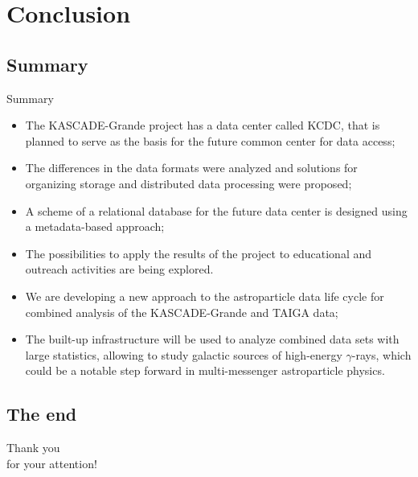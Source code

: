 \section{Conclusion}
\subsection{Summary}

\begin{frame}{Summary}
  \begin{itemize}
    \item The KASCADE-Grande project has a data center called KCDC, that is planned to serve as the basis for the future common center for data access;
    \item The differences in the data formats were analyzed and solutions for organizing storage and distributed data processing were proposed;
    \item A scheme of a relational database for the future data center is designed using a metadata-based approach;
    \item The possibilities to apply the results of the project to educational and outreach activities are being explored.
    \item We are developing a new approach to the astroparticle data life cycle for combined analysis of the KASCADE-Grande and TAIGA data;
    \item The built-up infrastructure will be used to analyze combined data sets with large statistics, allowing to study galactic sources of high-energy $\gamma$-rays, which could be a notable step forward in multi-messenger astroparticle physics.
  \end{itemize}
\end{frame}

\subsection{The end}
\begin{frame}{}
  \begin{center}
    \textcolor{kit-green100}{\Huge Thank you\\for your attention!\vspace{1em}}

  \end{center}
\end{frame}
